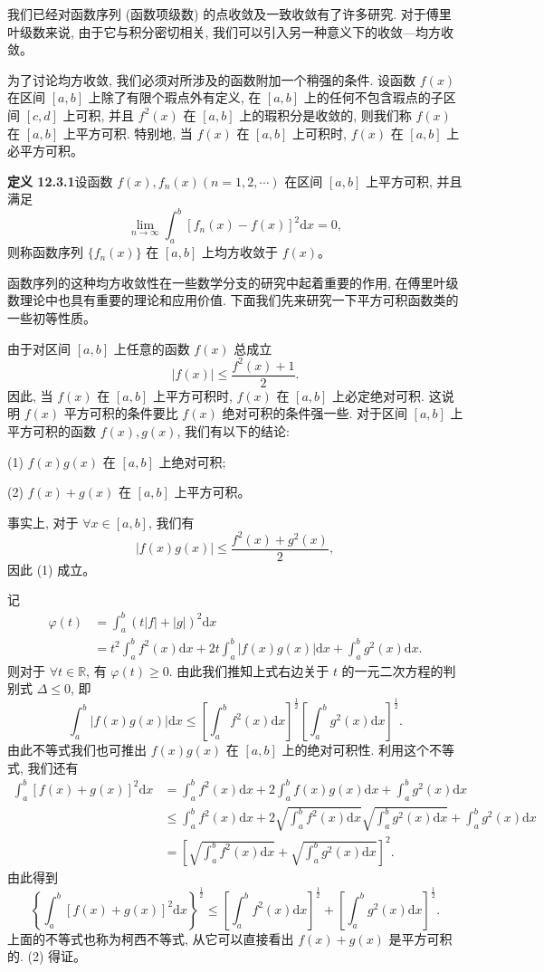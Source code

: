 \documentclass[UTF8, 12pt, fontset=fandol, oneside]{ctexart}
\begin{document}
我们已经对函数序列 (函数项级数) 的点收敛及一致收敛有了许多研究. 对于傅里叶级数来说, 由于它与积分密切相关, 我们可以引入另一种意义下的收敛---均方收敛。

为了讨论均方收敛, 我们必须对所涉及的函数附加一个稍强的条件. 设函数 $f(x)$ 在区间 $[a,b]$ 上除了有限个瑕点外有定义, 在 $[a,b]$ 上的任何不包含瑕点的子区间 $[c,d]$ 上可积, 并且 $f^2(x)$ 在 $[a,b]$ 上的瑕积分是收敛的, 则我们称 $f(x)$ 在 $[a,b]$ 上平方可积. 特别地, 当 $f(x)$ 在 $[a,b]$ 上可积时, $f(x)$ 在 $[a,b]$ 上必平方可积。

\noindent\textbf{定义 12.3.1}\quad 设函数 $f(x),f_n(x)(n=1,2,\cdots)$ 在区间 $[a,b]$ 上平方可积, 并且满足
\[
  \lim_{n\to\infty}\int_a^b[f_n(x)-f(x)]^2\mathrm dx=0,
\]
则称函数序列 $\{f_n(x)\}$ 在 $[a,b]$ 上均方收敛于 $f(x)$。

函数序列的这种均方收敛性在一些数学分支的研究中起着重要的作用, 在傅里叶级数理论中也具有重要的理论和应用价值. 下面我们先来研究一下平方可积函数类的一些初等性质。

由于对区间 $[a,b]$ 上任意的函数 $f(x)$ 总成立
\[
  |f(x)|\leqslant\frac{f^2(x)+1}{2}.
\]
因此, 当 $f(x)$ 在 $[a,b]$ 上平方可积时, $f(x)$ 在 $[a,b]$ 上必定绝对可积. 这说明 $f(x)$ 平方可积的条件要比 $f(x)$ 绝对可积的条件强一些. 对于区间 $[a,b]$ 上平方可积的函数 $f(x),g(x)$, 我们有以下的结论:

(1) $f(x)g(x)$ 在 $[a,b]$ 上绝对可积;

(2) $f(x)+g(x)$ 在 $[a,b]$ 上平方可积。

事实上, 对于 $\forall x\in[a,b]$, 我们有
\[
  |f(x)g(x)|\leqslant\frac{f^2(x)+g^2(x)}{2},
\]
因此 (1) 成立。

记
\[
\begin{aligned}
  \varphi(t)
  &=\int_a^b(t|f|+|g|)^2\mathrm dx\\
  &=t^2\int_a^bf^2(x)\mathrm dx
    +2t\int_a^b|f(x)g(x)|\mathrm dx
    +\int_a^bg^2(x)\mathrm dx.
\end{aligned}
\]
则对于 $\forall t\in\mathbb R$, 有 $\varphi(t)\geqslant0$. 由此我们推知上式右边关于 $t$ 的一元二次方程的判别式 $\Delta\leqslant0$, 即
\[
  \int_a^b|f(x)g(x)|\mathrm dx
  \leqslant
  \left[\int_a^bf^2(x)\mathrm dx\right]^{\frac12}
  \left[\int_a^bg^2(x)\mathrm dx\right]^{\frac12}.
\]
由此不等式我们也可推出 $f(x)g(x)$ 在 $[a,b]$ 上的绝对可积性. 利用这个不等式, 我们还有
\[
\begin{aligned}
  \int_a^b[f(x)+g(x)]^2\mathrm dx
  &=\int_a^bf^2(x)\mathrm dx+2\int_a^bf(x)g(x)\mathrm dx+\int_a^bg^2(x)\mathrm dx\\
  &\leqslant\int_a^bf^2(x)\mathrm dx
    +2\sqrt{\int_a^bf^2(x)\mathrm dx}\sqrt{\int_a^bg^2(x)\mathrm dx}
    +\int_a^bg^2(x)\mathrm dx\\
  &=\left[
    \sqrt{\int_a^bf^2(x)\mathrm dx}
    +\sqrt{\int_a^bg^2(x)\mathrm dx}
  \right]^2.
\end{aligned}
\]
由此得到
\[
  \left\{\int_a^b[f(x)+g(x)]^2\mathrm dx\right\}^{\frac12}
  \leqslant
  \left[\int_a^bf^2(x)\mathrm dx\right]^{\frac12}
  +
  \left[\int_a^bg^2(x)\mathrm dx\right]^{\frac12}.
\]
上面的不等式也称为柯西不等式, 从它可以直接看出 $f(x)+g(x)$ 是平方可积的. (2) 得证。
\end{document}
